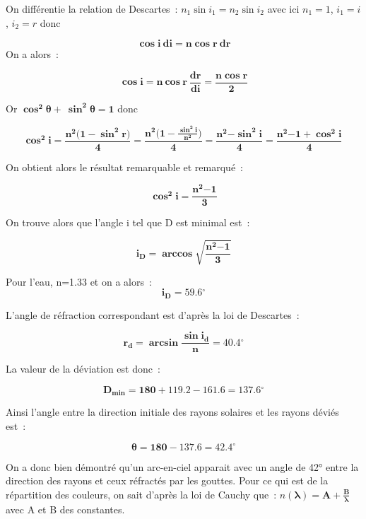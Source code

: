 \documentclass[
]{article}
\begin{document}
On différentie la relation de Descartes~:
\(n_{1}\sin{i_{1} = n_{2}\sin i_{2}}\) avec ici \(n_{1} = 1\),
\(i_{1} = i\), \(i_{2} = r\) donc

\[\mathbf{\cos}{\mathbf{i\ di = n}\mathbf{\cos}\mathbf{r\ dr}}
\]On a alors~:

\[\mathbf{\cos}{\mathbf{i = n\ cos\ r\ }\frac{\mathbf{dr}}{\mathbf{di}}\mathbf{=}\frac{\mathbf{n\cos r}}{\mathbf{2}}}\]

Or
\(\mathbf{\cos}^{\mathbf{2}}\mathbf{\theta + \ }\mathbf{\sin}^{\mathbf{2}}\mathbf{\theta = 1}\)
donc

\[\mathbf{\cos}^{\mathbf{2}}\mathbf{i =}\frac{\mathbf{n}^{\mathbf{2}}\mathbf{(1 -}\mathbf{\sin}^{\mathbf{2}}\mathbf{r)}}{\mathbf{4}}\mathbf{=}\frac{\mathbf{n}^{\mathbf{2}}\mathbf{(1 -}\frac{\mathbf{\sin}^{\mathbf{2}}\mathbf{i}}{\mathbf{n}^{\mathbf{2}}}\mathbf{)}}{\mathbf{4}}\mathbf{=}\frac{\mathbf{n}^{\mathbf{2}}\mathbf{-}\mathbf{\sin}^{\mathbf{2}}\mathbf{i}}{\mathbf{4}}\mathbf{=}\frac{\mathbf{n}^{\mathbf{2}}\mathbf{- 1 +}\mathbf{\cos}^{\mathbf{2}}\mathbf{i}}{\mathbf{4}}\mathbf{\ }\]

On obtient alors le résultat remarquable et remarqué~:

\[\mathbf{\cos}^{\mathbf{2}}\mathbf{i =}\frac{\mathbf{n}^{\mathbf{2}}\mathbf{- 1}}{\mathbf{3}}\]

On trouve alors que l'angle i tel que D est minimal est~:

\[\mathbf{i}_{\mathbf{D}}\mathbf{= \arccos}\sqrt{\frac{\mathbf{n}^{\mathbf{2}}\mathbf{- 1}}{\mathbf{3}}}\]

Pour l'eau, n=1.33 et on a alors~: \textbf{\hfill\break
}\[\mathbf{i}_{\mathbf{D}}\mathbf{= 59.6{^\circ}}\]

L'angle de réfraction correspondant est d'après la loi de Descartes~:

\[\mathbf{r}_{\mathbf{d}}\mathbf{=}\mathbf{\arcsin}\frac{\mathbf{\sin}\mathbf{i}_{\mathbf{d}}}{\mathbf{n}}\mathbf{= 40.4{^\circ}}\]

La valeur de la déviation est donc~:

\[\mathbf{D}_{\mathbf{\min}}\mathbf{= 180 + 119.2 - 161.6 = 137.6{^\circ}}\]

Ainsi l'angle entre la direction initiale des rayons solaires et les
rayons déviés est~:

\[\mathbf{\theta = 180 - 137.6 = 42.4{^\circ}}\]

On a donc bien démontré qu'un arc-en-ciel apparait avec un angle de 42°
entre la direction des rayons et ceux réfractés par les gouttes. Pour ce
qui est de la répartition des couleurs, on sait d'après la loi de Cauchy
que~:
\(n\left( \mathbf{\lambda} \right)\mathbf{= A +}\frac{\mathbf{B}}{\mathbf{\lambda}}\)
avec A et B des constantes.
\end{document}
